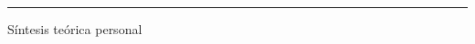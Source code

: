\documentclass[11pt,openany]{book}
\begin{document}
\begin{titlepage}
  \centering
  \vspace*{4cm}
  {\fontsize{22}{26}\selectfont\bfseries\color{textgray} \materiaActual \par}
  \vspace{0.5cm}
  {\large\color{rulegray}\rule{0.85\linewidth}{0.4pt}\par}
  \vspace{1cm}
  {\large\color{textgray} Síntesis teórica personal \par}
  \vspace{0.3cm}
  {\normalsize\color{rulegray} \miNombre \par}
\end{titlepage}

\tableofcontents

\end{document}
